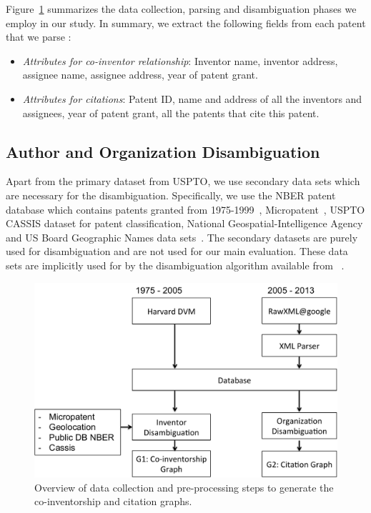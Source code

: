 Figure~\ref{process} summarizes the data collection, parsing and disambiguation phases we employ in our study.
In summary, we extract the following fields from each patent that we parse :

\begin{itemize}
\item {\em Attributes for co-inventor relationship}:
Inventor name, inventor address, assignee name, assignee address, year of patent grant.

\item {\em Attributes for citations}:
Patent ID, name and address of all the inventors and assignees, year of patent grant, all the patents that cite this patent.
\end{itemize}


\subsection{Author and Organization Disambiguation}

Apart from the primary dataset from USPTO, we use secondary data sets which are necessary for the disambiguation. Specifically, we use the NBER patent database which contains patents granted from 1975-1999~\cite{NBER}, Micropatent~\cite{micropatent}, USPTO CASSIS dataset for patent classification, National Geospatial-Intelligence Agency and US Board Geographic Names data sets~\cite{geocoding, geotable}. The secondary datasets are purely used for disambiguation and are not used for our main evaluation. These data sets are implicitly used for by the disambiguation algorithm available from ~\cite{disambiguation}.

\begin{figure}[H]
		  \centering	
          \includegraphics[scale=0.4]{figure/process.pdf}
          \caption{Overview of data collection and pre-processing steps to generate the co-inventorship and citation graphs.}
          \label{process}

\end{figure}


